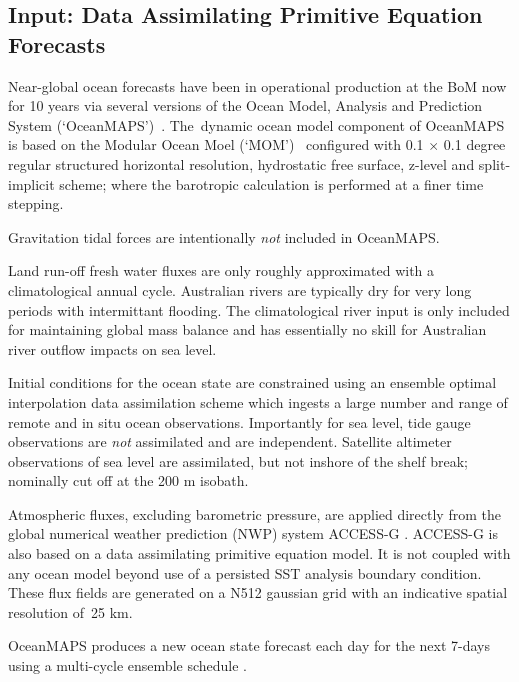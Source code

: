 \subsection{ Input: Data Assimilating Primitive Equation Forecasts }
\label{sec:dynamicmodels}

Near-global ocean forecasts have been in operational production at the BoM now for 10 years via several versions of the Ocean Model, Analysis and Prediction System (`OceanMAPS')~\cite{Brassington:2007ut,NMOC:2007wq,BureauofMeterology:2011ta,Brassington:2012wm}.
The~dynamic ocean model component of OceanMAPS is based on the Modular Ocean Moel (`MOM')~\cite{Griffies:2008vh} configured with 0.1 $\times$ 0.1 degree regular structured horizontal resolution, hydrostatic free surface, z-level and split-implicit scheme; where the barotropic calculation is performed at a finer time stepping. 

Gravitation tidal forces are intentionally \textit{not} included in OceanMAPS.      


Land run-off fresh water fluxes are only roughly approximated with a climatological annual cycle. 
Australian rivers are typically dry for very long periods with intermittant flooding.   
The climatological river input is only included for maintaining global mass balance and has essentially no skill for Australian river outflow impacts on sea level.    


Initial conditions for the ocean state are constrained using an ensemble optimal interpolation data assimilation scheme \cite{Oke:2008wr} which ingests a large number and range of remote and in situ ocean observations. 
Importantly for sea level, tide gauge observations are \textit{not} assimilated and are independent.   
Satellite altimeter observations of sea level are assimilated, but not inshore of the shelf break; nominally cut off at the 200 m isobath.


Atmospheric fluxes, excluding barometric pressure, are applied directly from the global numerical weather prediction (NWP) system ACCESS-G \cite{BureauofMeterology:C8IaJ2Qq}.
ACCESS-G is also based on a data assimilating primitive equation model.
It is not coupled with any ocean model beyond use of a persisted SST analysis boundary condition.
These flux fields are generated on a N512 gaussian grid with an indicative spatial resolution of~25 km. 

OceanMAPS produces a new ocean state forecast each day for the next 7-days using a multi-cycle ensemble schedule \cite{GaryBBrassington:2013jw}.

